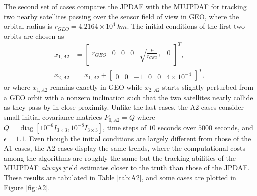 \documentclass[letterpaper, paper,10pt]{AAS}		%
\newcommand{\diag}{\mathop{\mathrm{diag}}\nolimits}
\begin{document}
The second set of cases compares the JPDAF with the MUJPDAF for tracking two nearby satellites passing over the sensor field of view in GEO, where the orbital radius is $r_{GEO}=4.2164\times10^{4}\ km$. The initial conditions of the first two orbits are chosen as
\begin{align}
x_{1,A2}&=\begin{bmatrix}r_{GEO} & 0 & 0 & 0 & \sqrt{\frac{\mu}{r_{GEO}}}, & 0\end{bmatrix}^T,
\\
x_{2,A2}&=x_{1,A2}+\begin{bmatrix}
0 & 0 & -1 & 0 & 0 & 4\times10^{-4}
\end{bmatrix}^T,
\end{align}
or where $x_{1,A2}$ remains exactly in GEO while $x_{2,A2}$ starts slightly perturbed from a GEO orbit with a nonzero inclination such that the two satellites nearly collide as they pass by in close proximity.
Unlike the last cases, the A2 cases consider small initial covariance matrices $P_{0,A2}= Q$ where $Q=\diag[10^{-6}I_{3\times3}, 10^{-8}I_{3\times3}]$, time steps of $10$ seconds over $5000$ seconds, and $\epsilon=1.1$.
Even though the initial conditions are largely different from those of the A1 cases, the A2 cases display the same trends, where the computational costs among the algorithms are roughly the same but the tracking abilities of the MUJPDAF \emph{always} yield estimates closer to the truth than those of the JPDAF.
These results are tabulated in Table \ref{tab:A2}, and some cases are plotted in Figure \ref{fig:A2}.
\end{document}
